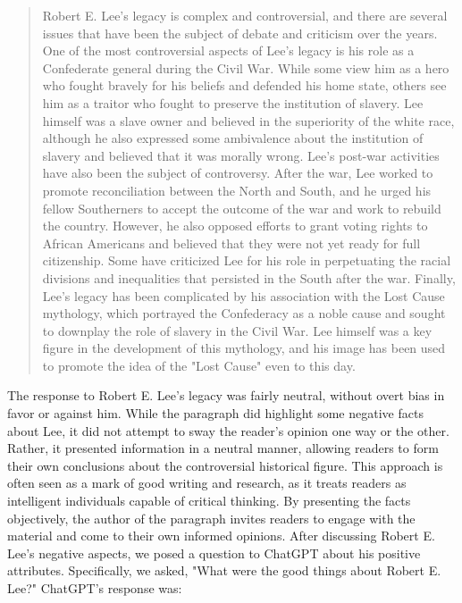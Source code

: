 \documentclass[letterpaper, 10pt, conference]{ieeeconf}
\begin{document}
    \begin{quote}
        
    Robert E. Lee's legacy is complex and controversial, and there are several issues that have been the subject of debate
    and criticism over the years. One of the most controversial aspects of Lee's legacy is his role as a Confederate general
    during the Civil War. While some view him as a hero who fought bravely for his beliefs and defended his home state,
    others see him as a traitor who fought to preserve the institution of slavery. Lee himself was a slave owner and believed
    in the superiority of the white race, although he also expressed some ambivalence about the institution of slavery and
    believed that it was morally wrong. Lee's post-war activities have also been the subject of controversy. After the war,
    Lee worked to promote reconciliation between the North and South, and he urged his fellow Southerners to accept the
    outcome of the war and work to rebuild the country. However, he also opposed efforts to grant voting rights to African
    Americans and believed that they were not yet ready for full citizenship. Some have criticized Lee for his role in
    perpetuating the racial divisions and inequalities that persisted in the South after the war. Finally, Lee's legacy has
    been complicated by his association with the Lost Cause mythology, which portrayed the Confederacy as a noble cause
    and sought to downplay the role of slavery in the Civil War. Lee himself was a key figure in the development of this
    mythology, and his image has been used to promote the idea of the "Lost Cause" even to this day\cite{navarburnett2023}. 
    \end{quote}
    The response to Robert E. Lee's legacy was fairly neutral, without overt bias in favor or against him. While the paragraph did
    highlight some negative facts about Lee, it did not attempt to sway the reader's opinion one way or the other. Rather, it presented
    information in a neutral manner, allowing readers to form their own conclusions about the controversial historical figure. This
    approach is often seen as a mark of good writing and research, as it treats readers as intelligent individuals capable of critical
    thinking. By presenting the facts objectively, the author of the paragraph invites readers to engage with the material and come to
    their own informed opinions.
    After discussing Robert E. Lee's negative aspects, we posed a question to ChatGPT about his positive attributes. Specifically, we
    asked, "What were the good things about Robert E. Lee?" ChatGPT's response was:
\end{document}
